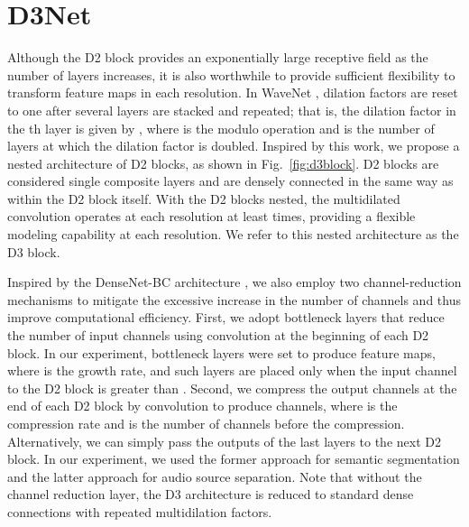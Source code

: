 \documentclass[final]{cvpr}
\begin{document}
\section{D3Net}
\label{sec:d3}
Although the D2 block provides an exponentially large receptive field as the number of layers increases, it is also worthwhile to provide sufficient flexibility to transform feature maps in each resolution. In WaveNet \cite{Aaron2016WN}, dilation factors are reset to one after several layers are stacked and repeated; that is, the dilation factor in the th layer is given by , where  is the modulo operation and  is the number of layers at which the dilation factor is doubled. Inspired by this work, we propose a nested architecture of D2 blocks, as shown in Fig.~\ref{fig:d3block}. D2 blocks are considered single composite layers and are densely connected in the same way as within the D2 block itself. With the  D2 blocks nested, the multidilated convolution operates at each resolution at least  times, providing a flexible modeling capability at each resolution. We refer to this nested architecture as the D3 block. 

Inspired by the DenseNet-BC architecture \cite{Huang17Densenet}, we also employ two channel-reduction mechanisms to mitigate the excessive increase in the number of channels and thus improve computational efficiency. First, we adopt bottleneck layers that reduce the number of input channels using   convolution at the beginning of each D2 block. In our experiment, bottleneck layers were set to produce  feature maps, where  is the growth rate, and such layers are placed only when the input channel to the D2 block is greater than . Second, we compress the output channels at the end of each D2 block by  convolution to produce  channels, where  is the compression rate and  is the number of channels before the compression. Alternatively, we can simply pass the outputs of the last  layers to the next D2 block. 
In our experiment, we used the former approach for semantic segmentation and the latter approach for audio source separation.
Note that without the channel reduction layer, the D3 architecture is reduced to standard dense connections with repeated multidilation factors.
\end{document}
